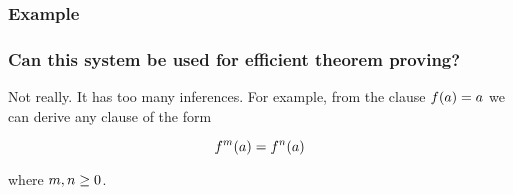 

                            \begin{frame}\frametitle{Example}


                                \end{frame}



                     \begin{frame}\frametitle{Can this system be used for
                         efficient theorem proving?}

Not really. It has \alert{too many inferences}. For example, from
the clause ${f(a) = a}$ we can derive any clause of the form

\[ {f^m(a) = f^n(a)} \]

where ${m,n \geq 0}$. 



                                \end{frame}
\endinput



           \begin{frame}\frametitle{Atom and literal orderings on equalities}

Equality atom comparison treats an equality $s \eql t$ as the multiset
$\mssetof{s,t}$.

\begin{itemize}
\item \alert{$(s' \eql t') \succl (s \eql t)$} if
      $\M{\mssetof{s',t'} \succ \mssetof{s,t}}$
\item \alert{$(s' \neql t') \succl (s \neql t)$} if
      $\M{\mssetof{s',t'} \succ \mssetof{s,t}}$
\end{itemize}


with $\succl$  being an induced ordering on literals. 

                                \end{frame}


